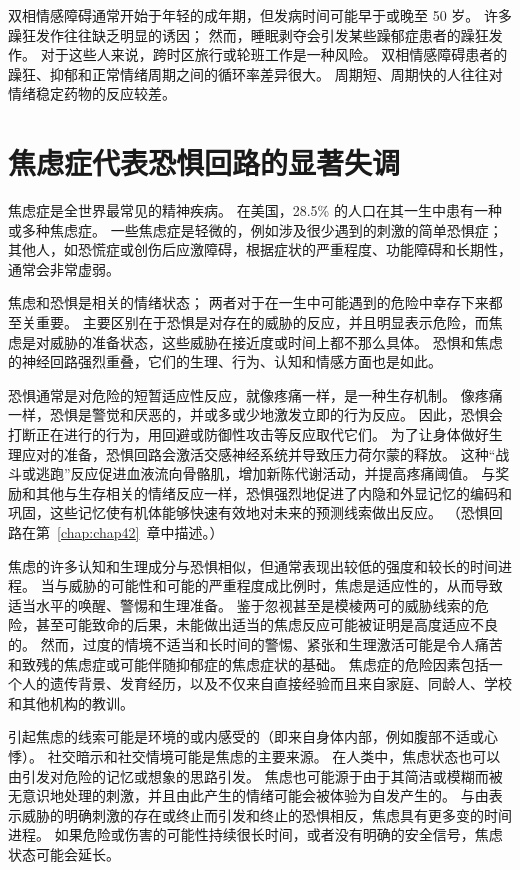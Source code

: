双相情感障碍通常开始于年轻的成年期，但发病时间可能早于或晚至 50 岁。
许多躁狂发作往往缺乏明显的诱因；
然而，睡眠剥夺会引发某些躁郁症患者的躁狂发作。
对于这些人来说，跨时区旅行或轮班工作是一种风险。
双相情感障碍患者的躁狂、抑郁和正常情绪周期之间的循环率差异很大。
周期短、周期快的人往往对情绪稳定药物的反应较差。



\section{焦虑症代表恐惧回路的显著失调}

焦虑症是全世界最常见的精神疾病。
在美国，28.5\% 的人口在其一生中患有一种或多种焦虑症。
一些焦虑症是轻微的，例如涉及很少遇到的刺激的简单恐惧症；
其他人，如恐慌症或创伤后应激障碍，根据症状的严重程度、功能障碍和长期性，通常会非常虚弱。


焦虑和恐惧是相关的情绪状态；
两者对于在一生中可能遇到的危险中幸存下来都至关重要。
主要区别在于恐惧是对存在的威胁的反应，并且明显表示危险，而焦虑是对威胁的准备状态，这些威胁在接近度或时间上都不那么具体。
恐惧和焦虑的神经回路强烈重叠，它们的生理、行为、认知和情感方面也是如此。


恐惧通常是对危险的短暂适应性反应，就像疼痛一样，是一种生存机制。
像疼痛一样，恐惧是警觉和厌恶的，并或多或少地激发立即的行为反应。
因此，恐惧会打断正在进行的行为，用回避或防御性攻击等反应取代它们。
为了让身体做好生理应对的准备，恐惧回路会激活交感神经系统并导致压力荷尔蒙的释放。
这种“战斗或逃跑”反应促进血液流向骨骼肌，增加新陈代谢活动，并提高疼痛阈值。
与奖励和其他与生存相关的情绪反应一样，恐惧强烈地促进了内隐和外显记忆的编码和巩固，这些记忆使有机体能够快速有效地对未来的预测线索做出反应。 
（恐惧回路在第~\ref{chap:chap42}~章中描述。）


焦虑的许多认知和生理成分与恐惧相似，但通常表现出较低的强度和较长的时间进程。
当与威胁的可能性和可能的严重程度成比例时，焦虑是适应性的，从而导致适当水平的唤醒、警惕和生理准备。
鉴于忽视甚至是模棱两可的威胁线索的危险，甚至可能致命的后果，未能做出适当的焦虑反应可能被证明是高度适应不良的。
然而，过度的情境不适当和长时间的警惕、紧张和生理激活可能是令人痛苦和致残的焦虑症或可能伴随抑郁症的焦虑症状的基础。
焦虑症的危险因素包括一个人的遗传背景、发育经历，以及不仅来自直接经验而且来自家庭、同龄人、学校和其他机构的教训。


引起焦虑的线索可能是环境的或内感受的（即来自身体内部，例如腹部不适或心悸）。
社交暗示和社交情境可能是焦虑的主要来源。
在人类中，焦虑状态也可以由引发对危险的记忆或想象的思路引发。
焦虑也可能源于由于其简洁或模糊而被无意识地处理的刺激，并且由此产生的情绪可能会被体验为自发产生的。
与由表示威胁的明确刺激的存在或终止而引发和终止的恐惧相反，焦虑具有更多变的时间进程。
如果危险或伤害的可能性持续很长时间，或者没有明确的安全信号，焦虑状态可能会延长。


